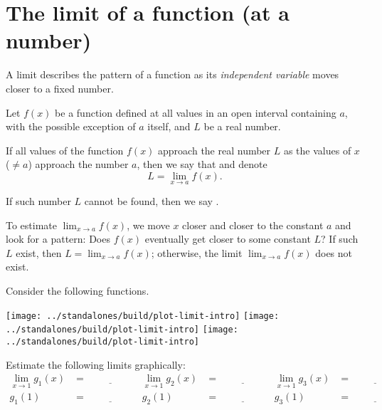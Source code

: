 \documentclass[../main.tex]{subfiles}
\begin{document}
 \section{The limit of a function (at a number)}
  A limit describes the pattern of a function as its \emph{independent variable} moves closer to a fixed number.

  \begin{mdframed}[style=withref-compact]
    Let \(f(x)\) be a function defined at all values in an open interval containing \(a\), with the possible exception of \(a\) itself, and \(L\) be a real number. 

    If all values of the function \(f(x)\) approach the real number \(L\) as the values of \(x\) (\(\ne a\)) approach the number \(a\), then we say that  and denote
    \[
      L = \lim_{x \to a} f(x).
    \]

    If such number \(L\) cannot be found, then we say .

  \end{mdframed}

  \faLightbulb{} To estimate \(\lim_{x \to a} f(x)\), we move \(x\) closer and closer to the constant \(a\) \underline{\hspace{6cm}} and look for a pattern: Does \(f(x)\) eventually get \underline{\hspace{3cm}} closer to some constant \(L\)? If such \(L\) exist, then \(L = \lim_{x \to a} f(x)\); otherwise, the limit \(\lim_{x \to a}f(x)\) does not exist.

  \begin{example}
    Consider the following functions.

    \centerline{
      \texttt{[image: ../standalones/build/plot-limit-intro]}
      \texttt{[image: ../standalones/build/plot-limit-intro]}
      \texttt{[image: ../standalones/build/plot-limit-intro]}
    }

    Estimate the following limits graphically:
    \begin{align*}
      \lim_{x \to 1} g_{1}(x)  
      &= \underline{\hspace{2cm}}  
      & \lim_{x \to 1} g_{2}(x) 
      &= \underline{\hspace{2cm}}
      & \lim_{x \to 1} g_{3}(x) 
      &= \underline{\hspace{2cm}} \\[2ex]
      g_{1}(1)  
      &= \underline{\hspace{2cm}}  
      & g_{2}(1) 
      &= \underline{\hspace{2cm}}
      & g_{3}(1) 
      &= \underline{\hspace{2cm}}
    \end{align*}
  \end{example}
\end{document}
